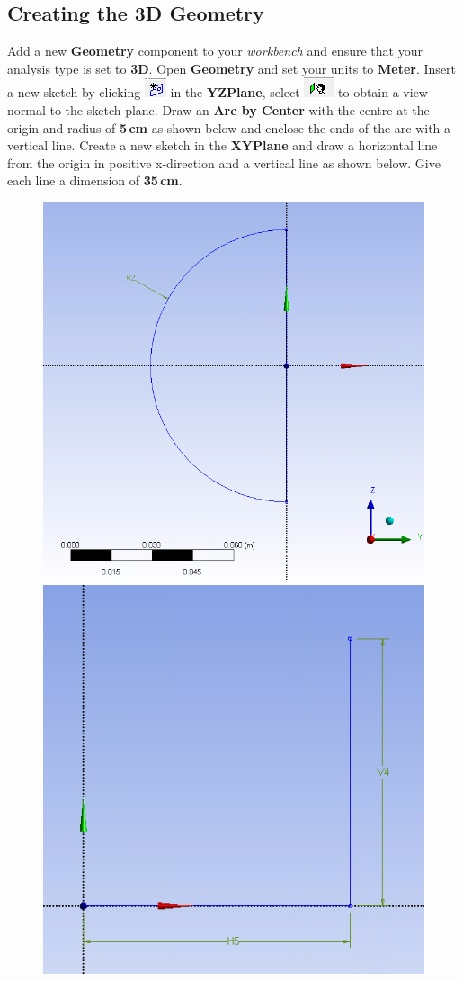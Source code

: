 \documentclass[12pts,a4paper,amsmath,amssymb,floatfix]{article}%
\newcommand\bfr[1]{\textcolor[rgb]{1,0.00,0.00}{\textbf{\textsf{#1}}}}
\begin{document}
\subsection{Creating the 3D Geometry}
Add a new \bfr{Geometry} component to your \emph{workbench} and ensure that your analysis type is set to \bfr{3D}. Open \bfr{Geometry} and set your units to \bfr{Meter}. Insert a new sketch by clicking  \includegraphics[width=.4cm]{./Pics/new_sketch.png} in the \bfr{YZPlane}, select \includegraphics[width=.4cm]{./Pics/normal_to.png} to obtain a view normal to the sketch plane. Draw an \bfr{Arc by Center} with the centre at the origin and radius of \bfr{5\,cm} as shown below and enclose the ends of the arc with a vertical line. Create a new sketch in the \bfr{XYPlane} and draw a horizontal line from the origin in positive x-direction and a vertical line as shown below. Give each line a dimension of \bfr{35\,cm}.
\begin{figure}[H] 
\begin{center}
\includegraphics[height=0.4\textwidth,clip]{./Pics/semi_circle.png}\quad
\includegraphics[height=0.4\textwidth,clip]{./Pics/hor_vert_line.png}
\end{center}
\end{figure}
\end{document}
